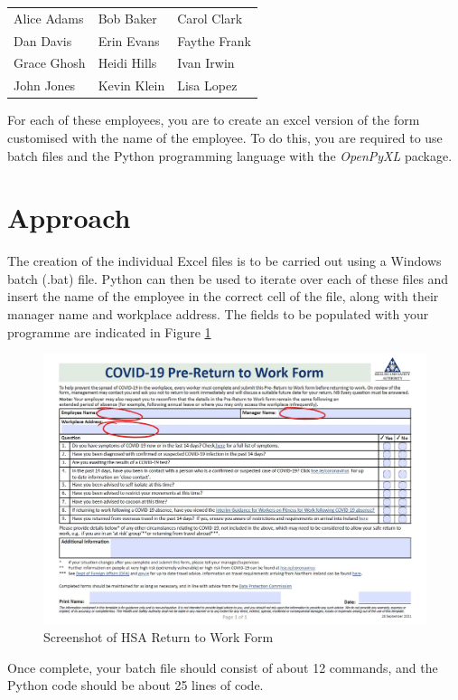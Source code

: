 \begin{tabularx}{\textwidth}{ |X|X|X| }
	\hline
	Alice Adams & Bob Baker & Carol Clark \\
	Dan Davis & Erin Evans & Faythe Frank \\
	Grace Ghosh & Heidi Hills & Ivan Irwin \\
	John Jones & Kevin Klein & Lisa Lopez \\
	\hline
\end{tabularx}

\vspace{0.5cm}

For each of these employees, you are to create an excel version of the form customised with the name of the employee.  To do this, you are required to use batch files and the Python programming language with the \textit{OpenPyXL} package.\\

\section*{Approach}

The creation of the individual Excel files is to be carried out using a Windows batch (.bat) file.  Python can then be used to iterate over each of these files and insert the name of the employee in the correct cell of the file, along with their manager name and workplace address.  The fields to be populated with your programme are indicated in Figure \ref{fig:hsaform}\\

\begin{figure}[h]
	\centering
	\includegraphics[width=0.7\linewidth]{img/HSAForm}
	\caption{Screenshot of HSA Return to Work Form}
	\label{fig:hsaform}
\end{figure}


Once complete, your batch file should consist of about 12 commands, and the Python code should be about 25 lines of code.


